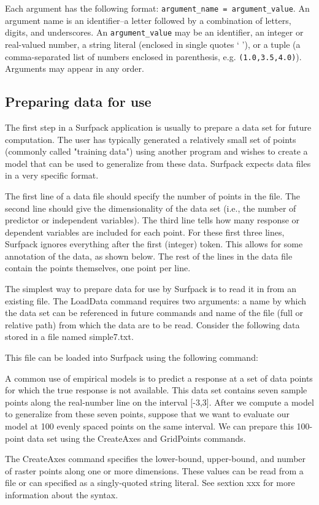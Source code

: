 \documentclass{article}
\begin{document}
Each argument has the following format: \texttt{argument\_name =
  argument\_value}.  An argument name is an identifier--a letter
followed by a combination of letters, digits, and underscores.  An
\texttt{argument\_value} may be an identifier, an integer or
real-valued number, a string literal (enclosed in single quotes ` '),
or a tuple (a comma-separated list of numbers enclosed in parenthesis,
e.g. \texttt{(1.0,3.5,4.0)}).  Arguments may appear in any order.

\subsection{Preparing data for use}\label{sec:format}
The first step in a Surfpack application is usually to prepare a data set for future computation.  The user has typically generated a relatively small set of points (commonly called "training data") using another program and wishes to create a model that can be used to generalize from these data.  Surfpack expects data files in a very specific format.

The first line of a data file should specify the number of points in the file.  The second line should give the dimensionality of the data set (i.e., the number of predictor or independent variables).  The third line tells how many response or dependent variables are included for each point.  For these first three lines, Surfpack ignores everything after the first (integer) token.  This allows for some annotation of the data, as shown below. 
The rest of the lines in the data file contain the points themselves, one point per
line.   



The simplest way to prepare data for use by Surfpack is to read it in from an existing file.  The LoadData command requires two arguments: a name by which the data set can be referenced in future commands and name of the file (full or relative path) from which the data are to be read.  Consider the following data stored in a file named simple7.txt.

This file can be loaded into Surfpack using the following command:

A common use of empirical models is to predict a response at a set of data points for which the true response is not available.  This data set contains seven sample points along the real-number line on the interval [-3,3].  After we compute a model to generalize from these seven points, suppose that we want to evaluate our model at 100 evenly spaced points on the same interval.  We can prepare this 100-point data set using the CreateAxes and GridPoints commands.

The CreateAxes command specifies the lower-bound, upper-bound, and number of raster points along one or more dimensions.  These values can be read from a file or can specified as a singly-quoted string literal.  See sextion xxx for more information about the syntax.
\end{document}
